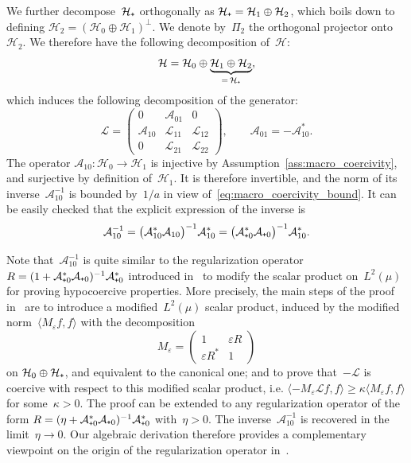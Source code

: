 \documentclass[AHL,Unicode,longabstracts,MathTools,published]{cedram}
\newcommand{\cL}{\mathcal{L}}
\newcommand{\cLa}{\mathcal{A}}
\newcommand{\cH}{\mathcal{H}}
\newcommand{\subplus}{\textnormal{\texttt{+}}}
\renewcommand{\geq}{\geqslant}
\begin{document}
We further decompose~$\cH_\subplus$ orthogonally as $\cH_\subplus = \cH_1 \oplus \cH_2$, which boils down to defining $\cH_2 = (\cH_0 \oplus \cH_1)^\perp$. We denote by~$\Pi_{2}$ the orthogonal projector onto~$\cH_2$. We therefore have the following decomposition of~$\cH$:
\[
\cH = \cH_{0} \oplus \underbrace{\cH_{1} \oplus \cH_{2}}_{=\,\cH_{\subplus}},
\]
which induces the following decomposition of the generator:
\[
\cL =
\begin{pmatrix}
0 & \cLa_{01} & 0 \\
\cLa_{10} & \cL_{11} & \cL_{12} \\
0 & \cL_{21} & \cL_{22}
\end{pmatrix},
\qquad
\cLa_{01} = -\cLa_{10}^{*}.
\]
The operator $\cLa_{10}:\cH_0\to\cH_1$ is injective by Assumption~\ref{ass:macro_coercivity}, and surjective by definition of~$\cH_{1}$. It is therefore invertible, and the norm of its inverse~$\cLa_{10}^{-1}$ is bounded by~$1/a$ in view of~\eqref{eq:macro_coercivity_bound}. It can be easily checked that the explicit expression of the inverse is
\[
\cLa_{10}^{-1} = \big(\cLa_{10}^{*}\cLa_{10}\big)^{-1} \cLa_{10}^{*} = \big(\cLa_{\subplus0}^{*}\cLa_{\subplus0}\big)^{-1} \cLa_{10}^{*}.
\]

\begin{rema}
Note that~$\cLa_{10}^{-1}$ is quite similar to the regularization operator $R = (1+\cLa_{\subplus0}^*\cLa_{\subplus0})^{-1}\cLa_{\subplus 0}^*$ introduced in~\cite{DMS09,DMS15,Herau06} to modify the scalar product on~$L^2(\mu)$ for proving hypocoercive properties. More precisely, the main steps of the proof in~\cite{DMS09,DMS15} are to introduce a modified~$L^2(\mu)$ scalar product, induced by the modified norm~$\langle M_\varepsilon f, f \rangle$ with the decomposition
\[
M_\varepsilon =
\begin{pmatrix}
1 & \varepsilon R\\
\varepsilon R^* & 1
\end{pmatrix}
\]
on $\mathcal{H}_0 \oplus \mathcal{H}_\subplus$, and equivalent to the canonical one; and to prove that~$-\cL$ is coercive with respect to this modified scalar product, i.e. $\langle -M_\varepsilon\cL f, f\rangle \geq \kappa \langle M_\varepsilon f,f\rangle$ for some~$\kappa>0$. The proof can be extended to any regularization operator of the form $R = (\eta+\cLa_{\subplus0}^*\cLa_{\subplus0})^{-1}\cLa_{\subplus 0}^*$ with~$\eta>0$. The inverse~$\cLa_{10}^{-1}$ is recovered in the limit~$\eta \to 0$. Our algebraic derivation therefore provides a complementary viewpoint on the origin of the regularization operator in~\cite{DMS09,DMS15,Herau06}.
\end{rema}
\end{document}
